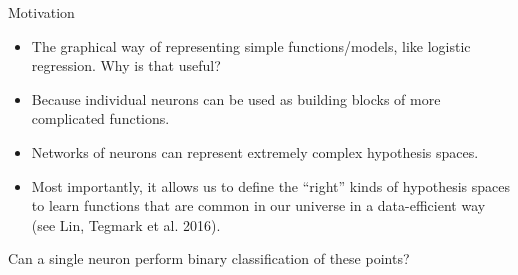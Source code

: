 \begin{vbframe}{Motivation}
\lz
\begin{itemize}
\item The graphical way of representing simple functions/models, like logistic regression. Why is that useful?
\lz
\item Because individual neurons can be used as building blocks of more complicated functions.
\lz
\item Networks of neurons can represent extremely complex hypothesis spaces.
\lz
\item Most importantly, it allows us to define the \enquote{right} kinds of hypothesis spaces to learn functions that are %
common in our universe in a data-efficient way (see Lin, Tegmark et al. 2016).
\end{itemize}
\framebreak
Can a single neuron perform binary classification of these points?
\begin{figure}
\centering
{}
\end{figure}

\framebreak


\end{vbframe}
